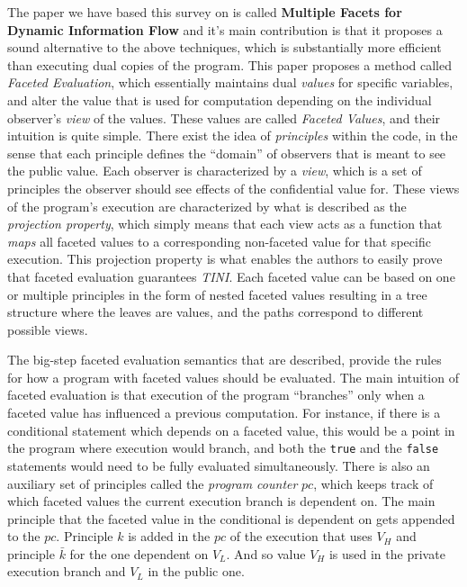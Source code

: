 \documentclass[preprint]{sigplanconf}
\begin{document}
The paper we have based this survey on is called \textbf{Multiple Facets for Dynamic Information Flow} \cite{austin2012multiple} and it's main contribution is that it proposes a sound alternative to the above techniques, which is substantially more efficient than executing dual copies of the program. This paper proposes a method called \textit{Faceted Evaluation}, which essentially maintains dual \textit{values} for specific variables, and alter the value that is used for computation depending on the individual observer's \textit{view} of the values.
These values are called \textit{Faceted Values}, and their intuition is quite simple. There exist the idea of \textit{principles} within the code, in the sense that each principle defines the ``domain'' of observers that is meant to see the public value. Each observer is characterized by a \textit{view}, which is a set of principles the observer should see effects of the confidential value for. These views of the program's execution are characterized by what is described as the \textit{projection property}, which simply means that each view acts as a function that \textit{maps} all faceted values to a corresponding non-faceted value for that specific execution. This projection property is what enables the authors to easily prove that faceted evaluation guarantees \textit{TINI}. Each faceted value can be based on one or multiple principles in the form of nested faceted values resulting in a tree structure where the leaves are values, and the paths correspond to different possible views. %

The big-step faceted evaluation semantics that are described, provide the rules for how a program with faceted values should be evaluated. The main intuition of faceted evaluation is that execution of the program ``branches'' only when a faceted value has influenced a previous computation. For instance, if there is a conditional statement which depends on a faceted value, this would be a point in the program where execution would branch, and both the \texttt{true} and the \texttt{false} statements would need to be fully evaluated simultaneously. There is also an auxiliary set of principles called the \textit{program counter} $pc$, which keeps track of which faceted values the current execution branch is dependent on. The main principle that the faceted value in the conditional is dependent on gets appended to the $pc$. Principle $k$ is added in the $pc$ of the execution that uses $V_H$ and principle $\bar{k}$ for the one dependent on $V_L$. And so value $V_H$ is used in the private execution branch and $V_L$ in the public one.
\end{document}
